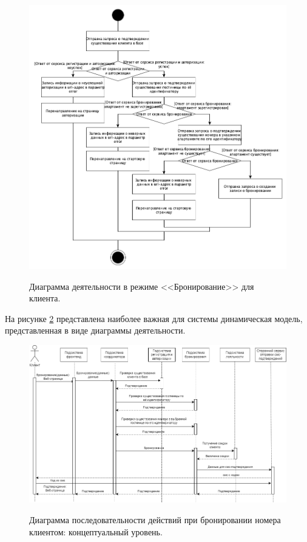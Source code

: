 \begin{figure}[h!]
	\begin{center}
		{\includegraphics[scale = 0.58]{img/schemas/schema-1.png}}
		\caption{Диаграмма деятельности в режиме <<Бронирование>> для клиента.}
		\label{fig:schema-reservation}
	\end{center}
\end{figure}

\pagebreak

На рисунке \ref{fig:flow-level1} представлена наиболее важная для системы динамическая модель, представленная в виде диаграммы деятельности.

\begin{figure}[h!]
	\begin{center}
		{\includegraphics[angle = 90, scale = 0.63]{img/flow/diag_general.png}}
		\caption{Диаграмма последовательности действий при бронировании номера клиентом: концептуальный уровень.}
		\label{fig:flow-level1}
	\end{center}
\end{figure}

